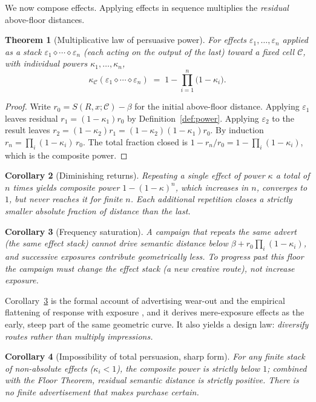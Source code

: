 \documentclass[twocolumn,11pt,a4paper]{article}
\theoremstyle{adv}
\newtheorem{theorem}{Theorem}[section]
\newtheorem{corollary}[theorem]{Corollary}
\theoremstyle{definition}
\theoremstyle{remark}
\newcommand{\Cell}{\mathcal{C}}        %
\newcommand{\Recv}{R}                  %
\newcommand{\Sval}{S}                  %
\newcommand{\floor}{\beta}            %
\newcommand{\Eff}{\varepsilon}        %
\newcommand{\pot}{\kappa}             %
\begin{document}
We now compose effects. Applying effects in sequence multiplies the
\emph{residual} above-floor distances.

\begin{theorem}[Multiplicative law of persuasive power]
\label{thm:multiplicative}
For effects $\Eff_1,\dots,\Eff_n$ applied as a stack
$\Eff_1\diamond\cdots\diamond\Eff_n$ (each acting on the output of the
last) toward a fixed cell $\Cell$, with individual powers
$\pot_1,\dots,\pot_n$,
\[
  \pot_\Cell(\Eff_1\diamond\cdots\diamond\Eff_n)
  \;=\;1-\prod_{i=1}^{n}\bigl(1-\pot_i\bigr).
\]
\end{theorem}

\begin{proof}
Write $r_0=\Sval(\Recv,x;\Cell)-\floor$ for the initial above-floor
distance. Applying $\Eff_1$ leaves residual $r_1=(1-\pot_1)r_0$ by
Definition~\ref{def:power}. Applying $\Eff_2$ to the result leaves
$r_2=(1-\pot_2)r_1=(1-\pot_2)(1-\pot_1)r_0$. By induction
$r_n=\prod_i(1-\pot_i)\,r_0$. The total fraction closed is
$1-r_n/r_0=1-\prod_i(1-\pot_i)$, which is the composite power.
\end{proof}

\begin{corollary}[Diminishing returns]
\label{cor:diminishing}
Repeating a single effect of power $\pot$ a total of $n$ times yields
composite power $1-(1-\pot)^n$, which increases in $n$, converges to $1$,
but never reaches it for finite $n$. Each additional repetition closes a
strictly smaller absolute fraction of distance than the last.
\end{corollary}

\begin{corollary}[Frequency saturation]
\label{cor:frequency}
A campaign that repeats the \emph{same} advert (the same effect stack)
cannot drive semantic distance below
$\floor + r_0\prod_i(1-\pot_i)$, and successive exposures contribute
geometrically less. To progress past this floor the campaign must change
the effect stack (a new creative route), not increase exposure.
\end{corollary}

Corollary~\ref{cor:frequency} is the formal account of advertising wear-out
and the empirical flattening of response with exposure
\citep{tellis1988,vakratsas1999}, and it derives mere-exposure effects
\citep{zajonc1968} as the early, steep part of the same geometric curve.
It also yields a design law: \emph{diversify routes rather than multiply
impressions.}

\begin{corollary}[Impossibility of total persuasion, sharp form]
\label{cor:impossible}
For any finite stack of non-absolute effects ($\pot_i<1$), the composite
power is strictly below $1$; combined with the Floor Theorem, residual
semantic distance is strictly positive. There is no finite advertisement
that makes purchase certain.
\end{corollary}
\end{document}
